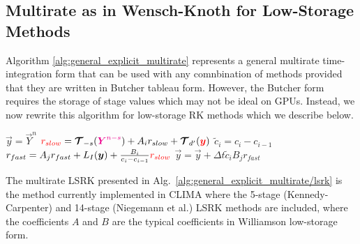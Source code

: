\documentclass{report}
\numberwithin{equation}{section}
\begin{document}
\subsection{Multirate as in Wensch-Knoth for Low-Storage Methods}
Algorithm \ref{alg:general_explicit_multirate} represents a general multirate time-integration form that can be used with any comnbination of methods provided that they are written in Butcher tableau form.  However, the Butcher form requires the storage of stage values which may not be ideal on GPUs. Instead, we now rewrite this algorithm for low-storage RK methods which we describe below.
\begin{algorithm}
\label{alg:general_explicit_multirate/lsrk}
\begin{algorithmic}
\State
{}
\State $\vec{y}=\vec{Y}^n$ 
\State $\textcolor{red}{r_{slow}}=\boldsymbol{{\mathcal{T}}}_{-s}(\textcolor{magenta}{ \boldsymbol{{Y}}^{n-s}}) + A_i r_{slow} + \boldsymbol{{\mathcal{T}}}_{d'}(\textcolor{red}{\boldsymbol{{y}}})$
\State $\widetilde{c}_i=c_i - c_{i-1}$
\State $r_{fast}=A_j r_{fast} + L_I(\boldsymbol{{y}}) + \frac{B_i}{c_i - c_{i-1}} \textcolor{red}{r_{slow}}$ 
\State $\vec{y} = \vec{y} + \Delta t \widetilde{c}_i  B_j r_{fast}$
\EndFor %
\EndFor %
\EndFunction
\end{algorithmic}
\end{algorithm}
The multirate LSRK presented in Alg.\  \ref{alg:general_explicit_multirate/lsrk} is the method currently implemented in CLIMA where the 5-stage (Kennedy-Carpenter) and 14-stage (Niegemann et al.) LSRK methods are included, where the coefficients $A$ and $B$ are the typical coefficients in Williamson low-storage form.
\end{document}

